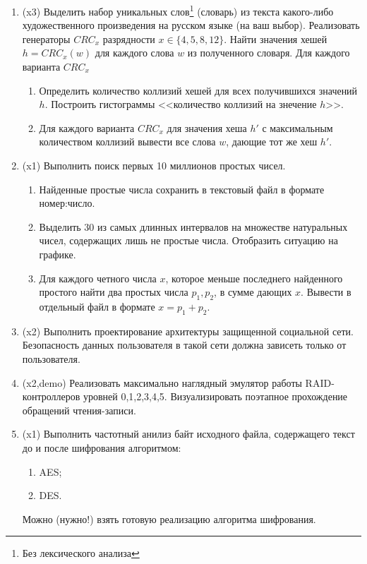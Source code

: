\documentclass[a4paper]{article}
\begin{document}
\begin{enumerate}

\item (x3) Выделить набор уникальных слов\footnote{Без лексического анализа} (словарь) из текста какого-либо художественного произведения на русском языке (на ваш выбор). Реализовать генераторы $CRC_x$ разрядности $x\in\{4,5,8,12\}$. Найти значения хешей $h=CRC_x(w)$ для каждого слова $w$ из полученного словаря. 
Для каждого варианта $CRC_x$
\begin{enumerate}
    \item Определить количество коллизий хешей для всех получившихся значений $h$. Построить гистограммы <<количество коллизий на знечение $h$>>.
    
    \item Для каждого варианта $CRC_x$ для значения хеша $h'$ с максимальным количеством коллизий вывести все слова $w$, дающие тот же хеш $h'$. 
\end{enumerate}

\item (x1) Выполнить поиск первых 10 миллионов простых чисел. 
\begin{enumerate}
    \item Найденные простые числа сохранить в текстовый файл в формате номер:число.
    \item Выделить 30 из самых длинных интервалов на множестве натуральных чисел, содержащих лишь не простые числа. Отобразить ситуацию на графике.
    \item Для каждого четного числа $x$, которое меньше последнего найденного простого найти два простых числа $p_1,p_2$, в сумме дающих $x$. Вывести в отдельный файл в формате $x=p_1+p_2$.
\end{enumerate}

\item (x2) Выполнить проектирование архитектуры защищенной социальной сети. Безопасность данных пользователя в такой сети должна зависеть только от пользователя.

\item (x2,demo) Реализовать максимально наглядный эмулятор работы RAID-контроллеров уровней 0,1,2,3,4,5. Визуализировать поэтапное прохождение обращений чтения-записи.

\item (x1) Выполнить частотный анилиз байт исходного файла, содержащего текст до и после шифрования алгоритмом:
\begin{enumerate}
    \item AES;
    \item DES.
\end{enumerate}
Можно (нужно!) взять готовую реализацию алгоритма шифрования.


\end{enumerate}
\end{document}
